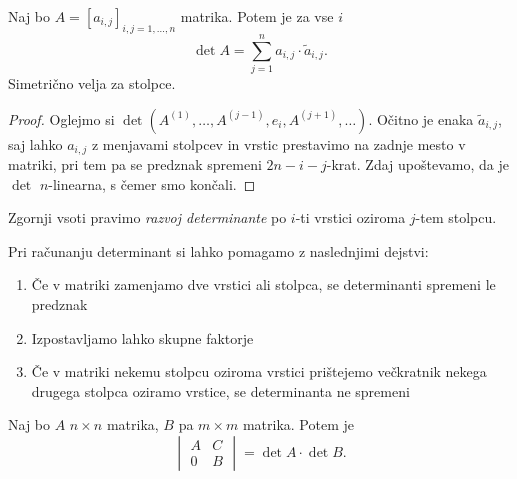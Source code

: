 \documentclass[12pt, a4paper]{article}
\begin{document}
\begin{izrek}
Naj bo $A=\left[a_{i,j}\right]_{i,j=1,\dots,n}$ matrika. Potem je za vse $i$
\[
\det A=\sum_{j=1}^n a_{i,j}\cdot\widetilde{a}_{i,j}.
\]
Simetrično velja za stolpce.
\end{izrek}

\begin{proof}
Oglejmo si $\det(A^{(1)},\dots,A^{(j-1)},e_i,A^{(j+1)},\dots)$. Očitno je enaka $\widetilde{a}_{i,j}$, saj lahko $a_{i,j}$ z menjavami stolpcev in vrstic prestavimo na zadnje mesto v matriki, pri tem pa se predznak spremeni $2n-i-j$-krat. Zdaj upoštevamo, da je $\det$ $n$-linearna, s čemer smo končali. 
\end{proof}

\begin{opomba}
Zgornji vsoti pravimo \emph{razvoj determinante} po $i$-ti vrstici oziroma $j$-tem stolpcu.
\end{opomba}

\begin{okvir}
\begin{posledica}
Pri računanju determinant si lahko pomagamo z naslednjimi dejstvi:

\begin{enumerate}[label=\roman*)]
\item Če v matriki zamenjamo dve vrstici ali stolpca, se determinanti spremeni le predznak
\item Izpostavljamo lahko skupne faktorje
\item Če v matriki nekemu stolpcu oziroma vrstici prištejemo večkratnik nekega drugega stolpca oziramo vrstice, se determinanta ne spremeni
\end{enumerate}
\end{posledica}
\end{okvir}

\begin{trditev}
Naj bo $A$ $n\times n$ matrika, $B$ pa $m\times m$ matrika. Potem je
\[
\begin{vmatrix}
A & C \\
0 & B
\end{vmatrix} = \det A\cdot\det B.
\]
\end{trditev}

\obvs
\end{document}
